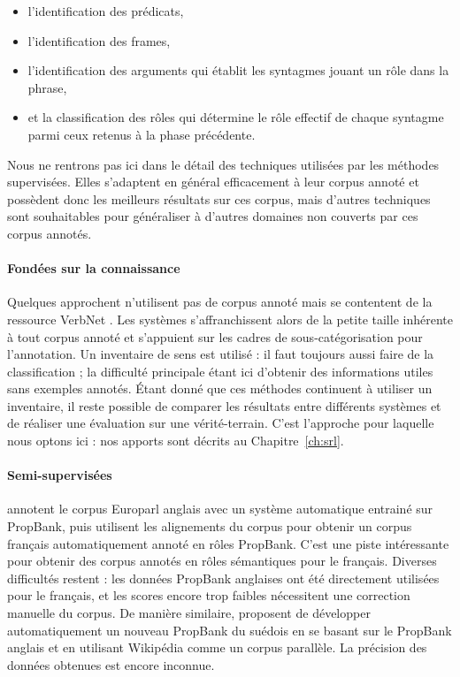 \begin{itemize}
    \item l'identification des prédicats,
    \item l'identification des frames,
    \item l'identification des arguments qui établit les syntagmes jouant un rôle dans la phrase,
    \item et la classification des rôles qui détermine le rôle effectif de
chaque syntagme parmi ceux retenus à la phase précédente.
\end{itemize}

Nous ne rentrons pas ici dans le détail des techniques utilisées par les
méthodes supervisées. Elles s'adaptent en général efficacement à leur corpus
annoté et possèdent donc les meilleurs résultats sur ces corpus, mais d'autres
techniques sont souhaitables pour généraliser à d'autres domaines non couverts
par ces corpus annotés.


\paragraph{Fondées sur la connaissance}

Quelques approchent n'utilisent pas de corpus annoté mais se contentent de la
ressource VerbNet
\citep{swier2004unsupervised,swier2005exploiting,pradet2013revisiting}. Les
systèmes s'affranchissent alors de la petite taille inhérente à tout corpus
annoté et s'appuient sur les cadres de sous-catégorisation pour l'annotation.
Un inventaire de sens est utilisé : il faut toujours aussi faire de la
classification ; la difficulté principale étant ici d'obtenir des informations
utiles sans exemples annotés. Étant donné que ces méthodes continuent à
utiliser un inventaire, il reste possible de comparer les résultats entre
différents systèmes et de réaliser une évaluation sur une vérité-terrain. C'est
l'approche pour laquelle nous optons ici : nos apports sont décrits au
Chapitre~\ref{ch:srl}.

\paragraph{Semi-supervisées}

\cite{vanderplas2014cross} annotent le corpus Europarl anglais avec un système
automatique entrainé sur PropBank, puis utilisent les alignements du corpus
pour obtenir un corpus français automatiquement annoté en rôles PropBank. C'est
une piste intéressante pour obtenir des corpus annotés en rôles sémantiques
pour le français. Diverses difficultés restent : les données PropBank anglaises
ont été directement utilisées pour le français, et les scores encore trop
faibles nécessitent une correction manuelle du corpus. De manière similaire,
\cite{exner2014using} proposent de développer automatiquement un nouveau
PropBank du suédois en se basant sur le PropBank anglais et en utilisant
Wikipédia comme un corpus parallèle. La précision des données obtenues est
encore inconnue.

